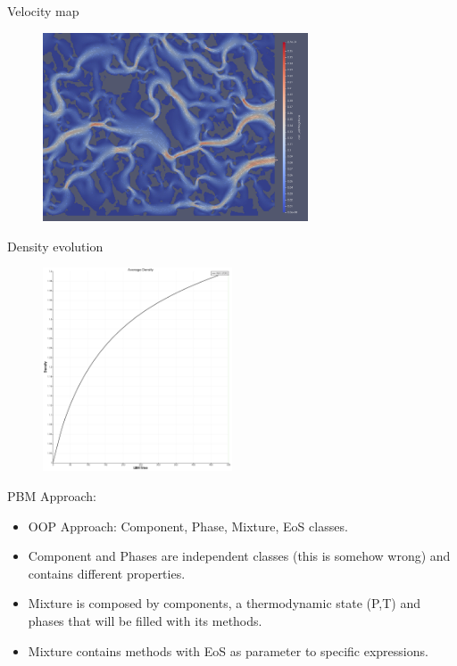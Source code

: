 \documentclass{beamer}
\begin{document}
	\begin{frame}{Velocity map}
		\begin{figure}
			\centering
			\includegraphics[width=0.7\textwidth]{pics/pmVelLowerRight.png}  
		\end{figure}
	\end{frame}
	\begin{frame}{Density evolution}
		\begin{figure}
			\centering
			\includegraphics[width=0.5\textwidth]{pics/pmDenAve.png}  
		\end{figure}
	\end{frame}

	\begin{frame}{PBM}
		Approach:
		\begin{itemize}
			\item OOP Approach: Component, Phase, Mixture, EoS classes.
			\item Component and Phases are independent classes (this is somehow wrong) and contains different properties.
			\item Mixture is composed by components, a thermodynamic state (P,T) and phases that will be filled with its methods.
			\item Mixture contains methods with EoS as parameter to specific expressions.
		\end{itemize}
	\end{frame}
\end{document}
